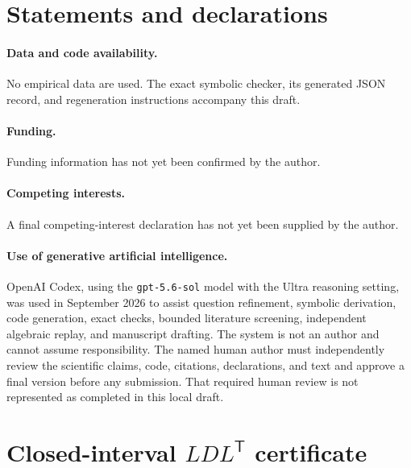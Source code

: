 \documentclass[11pt,a4paper]{article}
\theoremstyle{remark}
\begin{document}
\section*{Statements and declarations}

\paragraph{Data and code availability.}
No empirical data are used.  The exact symbolic checker, its generated JSON
record, and regeneration instructions accompany this draft.

\paragraph{Funding.}
Funding information has not yet been confirmed by the author.

\paragraph{Competing interests.}
A final competing-interest declaration has not yet been supplied by the
author.

\paragraph{Use of generative artificial intelligence.}
OpenAI Codex, using the \texttt{gpt-5.6-sol} model with the Ultra reasoning
setting, was used in September 2026 to assist question refinement, symbolic
derivation, code generation, exact checks, bounded literature screening,
independent algebraic replay, and manuscript drafting.  The system is not an
author and cannot assume responsibility.  The named human author must
independently review the scientific claims, code, citations, declarations,
and text and approve a final version before any submission.  That required
human review is not represented as completed in this local draft.

\appendix
\section{Closed-interval \texorpdfstring{$LDL^{\mathsf T}$}{LDL-transpose} certificate}
\label{app:pivots}
\end{document}
